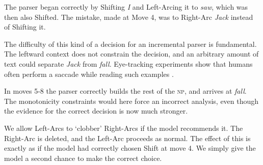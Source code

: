 \documentclass[11pt,letterpaper]{article}
\newcommand{\maybe}[1]{\textcolor{gray}{#1}}
\begin{document}
The parser began correctly by Shifting \emph{I}
and Left-Arcing it to \emph{saw}, which was then also Shifted. The mistake, made
at Move 4, was to Right-Arc \emph{Jack} instead of Shifting it.

The difficulty of this kind of a decision for an incremental parser is fundamental.
The leftward context does not constrain the decision, 
and an arbitrary amount of text could separate \emph{Jack} from
\emph{fall}. Eye-tracking
experiments show that humans often perform a saccade while reading such
examples \citep{FrazierRayner1982}.

In moves 5-8 the parser correctly builds the rest of the \textsc{np}, and arrives
at \emph{fall}. The monotonicity constraints would here force an incorrect
analysis,
even though the evidence for the correct decision is now much stronger.

We allow Left-Arcs to `clobber' Right-Arcs if the model
recommends it. The Right-Arc is deleted, and the Left-Arc proceeds as normal. The
effect of this is exactly as if the model had correctly chosen Shift at
move 4. We simply give the model a second chance to make the correct choice.
\end{document}
